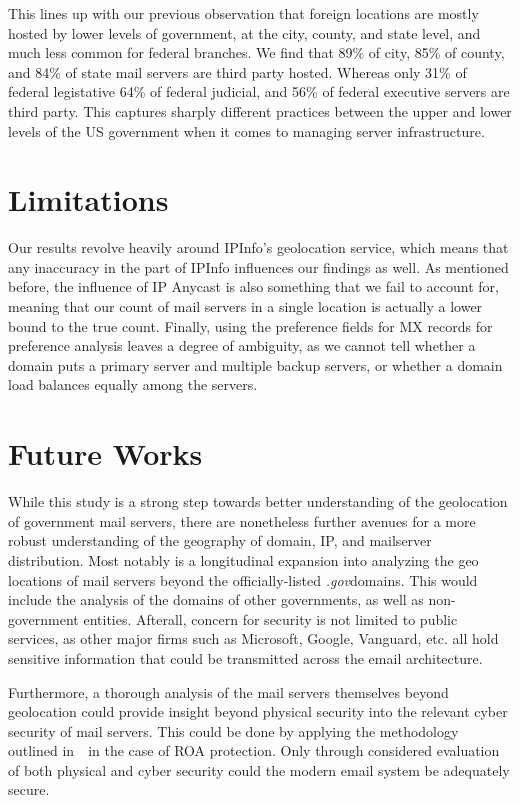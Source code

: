 \documentclass{hotnets21}
\newcommand{\dotgov}{\textit{.gov}\space}
\begin{document}
This lines up with our previous observation that foreign locations are mostly hosted by lower levels of government, at the city, county, and state level, and much less common for federal branches.
We find that 89\% of city, 85\% of county, and 84\% of state mail servers are third party hosted.
Whereas only 31\% of federal legistative 64\% of federal judicial, and 56\% of federal executive servers are third party.
This captures sharply different practices between the upper and lower levels of the US government when it comes to managing server infrastructure.

\section{Limitations}

Our results revolve heavily around IPInfo’s geolocation service, which means that any inaccuracy in the part of IPInfo influences our findings as well.
As mentioned before, the influence of IP Anycast is also something that we fail to account for, meaning that our count of mail servers in a single location is actually a lower bound to the true count.
Finally, using the preference fields for MX records for preference analysis leaves a degree of ambiguity, as we cannot tell whether a domain puts a primary server and multiple backup servers, or whether a domain load balances equally among the servers.

\section{Future Works}

While this study is a strong step towards better understanding of the geolocation of government mail servers, there are nonetheless further avenues for a more robust understanding of the geography of domain, IP, and mailserver distribution.
Most notably is a longitudinal expansion into analyzing the geo locations of mail servers beyond the officially-listed \dotgov domains.
This would include the analysis of the domains of other governments, as well as non-government entities.
Afterall, concern for security is not limited to public services, as other major firms such as Microsoft, Google, Vanguard, etc. all hold sensitive information that could be transmitted across the email architecture.

Furthermore, a thorough analysis of the mail servers themselves beyond geolocation could provide insight beyond physical security into the relevant cyber security of mail servers.
This could be done by applying the methodology outlined in~\cite{bartoli}~in the case of ROA protection.
Only through considered evaluation of both physical and cyber security could the modern email system be adequately secure.
\end{document}

